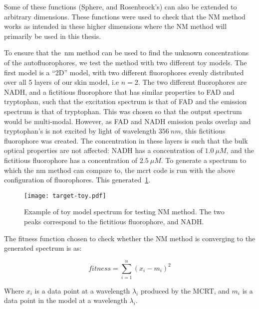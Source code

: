 Some of these functions (Sphere, and Rosenbrock's) can also be extended to arbitrary dimensions. These functions were used to check that the NM method works as intended in these higher dimensions where the NM method will primarily be used in this thesis.

To ensure that the~\gls*{nm} method can be used to find the unknown concentrations of the autofluorophores, we test the method with two different toy models.
The first model is a ``2D'' model, with two different fluorophores evenly distributed over all 5 layers of our skin model, i.e $n=2$. 
The two different fluorophores are NADH, and a fictitious fluorophore that has similar properties to FAD and tryptophan, such that the excitation spectrum is that of FAD and the emission spectrum is that of tryptophan.
This was chosen so that the output spectrum would be multi-modal.
However, as FAD and NADH emission peaks overlap and tryptophan's is not excited by light of wavelength $356~nm$, this fictitious fluorophore was created.
The concentration in these layers is such that the bulk optical properties are not affected: NADH has a concentration of $1.0~\mu M$, and the fictitious fluorophore has a concentration of $2.5~\mu M$.
To generate a spectrum to which the \gls*{nm} method can compare to, the \gls*{mcrt} code is run with the above configuration of fluorophores.
This generated~\cref{fig:toymodelspectra}.


\begin{figure}[!htbp]
  \centering
  \texttt{[image: target-toy.pdf]}
  \caption{Example of toy model spectrum for testing NM method. The two peaks correspond to the fictitious fluorophore, and NADH.}
  \label{fig:toymodelspectra}
\end{figure}

The fitness function chosen to check whether the NM method is converging to the generated spectrum is as:

\begin{equation}
fitness = \sum\limits_{i=1}^{n}(x_i-m_i)^2
\end{equation}

Where $x_i$ is a data point at a wavelength $\lambda_i$ produced by the MCRT, and $m_i$ is a data point in the model at a wavelength $\lambda_i$.

